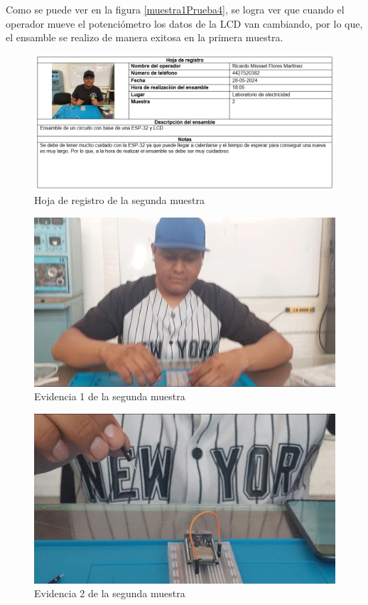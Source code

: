 Como se puede ver en la figura \ref{muestra1Prueba4}, se logra ver que cuando el operador mueve el potenciómetro los datos de la LCD van cambiando, por lo que, el ensamble se realizo de manera exitosa en la primera muestra.

\begin{figure}[H]
        \centering
        \includegraphics[trim = {0mm 0mm 0mm 0mm},clip,scale=0.2]{10/Img/hojaRegistro2.png}
        \caption{Hoja de registro de la segunda muestra}
        \label{hojaRegistro2}
    \end{figure}

\begin{figure}[H]
        \centering
        \includegraphics[trim = {0mm 0mm 0mm 0mm},clip,scale=0.2]{10/Img/muestra2Prueba1.jpg}
        \caption{Evidencia 1 de la segunda muestra}
        \label{muestra2Prueba1}
    \end{figure}

\begin{figure}[H]
        \centering
        \includegraphics[trim = {0mm 0mm 0mm 0mm},clip,scale=0.2]{10/Img/muestra2Prueba2.jpg}
        \caption{Evidencia 2 de la segunda muestra}
        \label{muestra2Prueba2}
    \end{figure}

